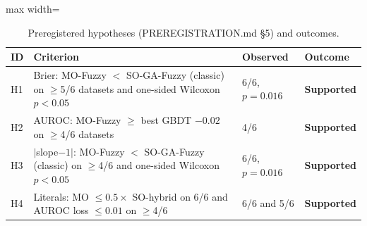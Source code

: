 \begin{table}[t]
\centering
\scriptsize
\setlength{\tabcolsep}{3pt}
\caption{Preregistered hypotheses (PREREGISTRATION.md \S5) and outcomes.}
\label{tab:hyp}
\begin{adjustbox}{max width=\linewidth}
\begin{tabular}{lp{5.4cm}lp{1.6cm}}
\toprule
ID & Criterion & Observed & Outcome \\
\midrule
H1 & Brier: MO-Fuzzy $<$ SO-GA-Fuzzy (classic) on $\geq$5/6 datasets and one-sided Wilcoxon $p<0.05$ & 6/6, $p=0.016$ & \textbf{Supported} \\
H2 & AUROC: MO-Fuzzy $\geq$ best GBDT $-0.02$ on $\geq$4/6 datasets & 4/6 & \textbf{Supported} \\
H3 & $|$slope$-1|$: MO-Fuzzy $<$ SO-GA-Fuzzy (classic) on $\geq$4/6 and one-sided Wilcoxon $p<0.05$ & 6/6, $p=0.016$ & \textbf{Supported} \\
H4 & Literals: MO $\leq 0.5\times$ SO-hybrid on 6/6 and AUROC loss $\leq 0.01$ on $\geq$4/6 & 6/6 and 5/6 & \textbf{Supported} \\
\bottomrule
\end{tabular}
\end{adjustbox}
\end{table}
